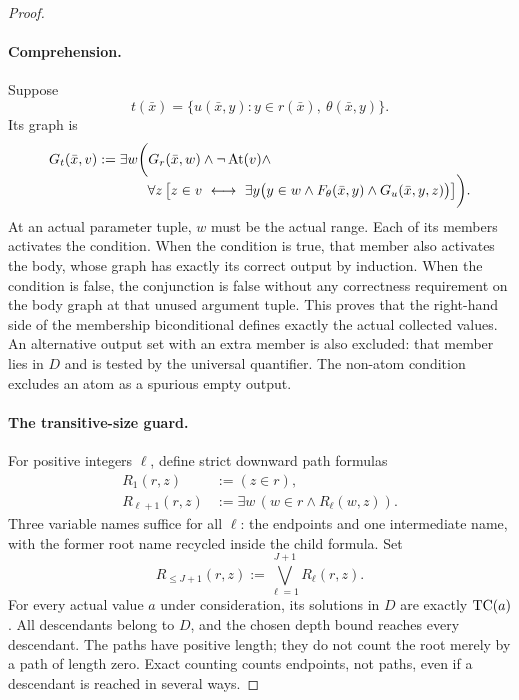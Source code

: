 \begin{proof}
\paragraph{Comprehension.}
Suppose
\[
 t(\bar x)=\{u(\bar x,y):y\in r(\bar x),\ \theta(\bar x,y)\}.
\]
Its graph is
\[
 \begin{split}
 G_t(\bar x,v):={}&
 \exists w\biggl(
 G_r(\bar x,w)\land\neg\operatorname{At}(v)\land\\[-2mm]
 &\hspace{7mm}
 \forall z\left[
 z\in v\ \longleftrightarrow\
 \exists y\bigl(y\in w\land F_\theta(\bar x,y)
                       \land G_u(\bar x,y,z)\bigr)
 \right]\biggr).
 \end{split}
\]
At an actual parameter tuple, \(w\) must be the actual range.  Each of its
members activates the condition.  When the condition is true, that
member also activates the body, whose graph has exactly its correct
output by induction.  When the condition is false, the conjunction is
false without any correctness requirement on the body graph at that
unused argument tuple.  This proves that the right-hand side of the
membership biconditional defines exactly the actual collected values.
An alternative output set with an extra member is also excluded:
that member lies in \(D\) and is tested by the universal quantifier.
The non-atom condition excludes an atom as a spurious empty output.

\paragraph{The transitive-size guard.}
For positive integers \(\ell\), define strict downward path formulas
\[
 \begin{split}
 R_1(r,z)&:=(z\in r),\\
 R_{\ell+1}(r,z)&:=
       \exists w\,(w\in r\land R_\ell(w,z)).
 \end{split}
\]
Three variable names suffice for all \(\ell\): the endpoints and one
intermediate name, with the former root name recycled inside the child
formula.  Set
\[
 R_{\le J+1}(r,z):=\bigvee_{\ell=1}^{J+1}R_\ell(r,z).
\]
For every actual value \(a\) under consideration, its solutions in \(D\)
are exactly \(\operatorname{TC}(a)\).  All descendants belong to \(D\), and the chosen
depth bound reaches every descendant.  The paths have positive length;
they do not count the root merely by a path of length zero.  Exact
counting counts endpoints, not paths, even if a descendant is reached
in several ways.


\end{proof}
